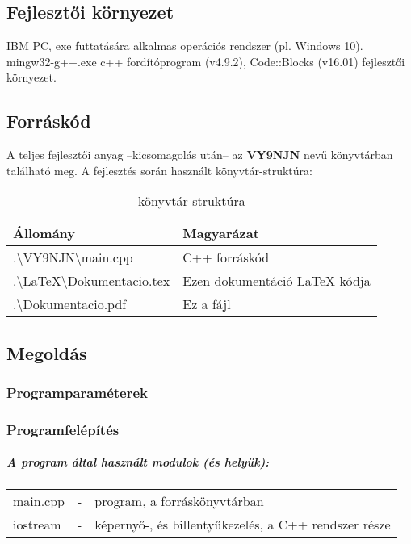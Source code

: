 \documentclass[a4paper]{article}
\begin{document}
    \subsection{Fejlesztői környezet}
    IBM PC, exe futtatására alkalmas operációs rendszer (pl. Windows 10). \\
    mingw32-g++.exe c++ fordítóprogram (v4.9.2), Code::Blocks (v16.01) fejlesztői környezet.
    \subsection{Forráskód}
    A teljes fejlesztői anyag –kicsomagolás után– az \textbf{VY9NJN} nevű könyvtárban található meg.
    A fejlesztés során használt könyvtár-struktúra:
    \begin{table}[H]
      \centering
      \caption{könyvtár-struktúra}
      \label{tab:table3}
      \begin{tabular}{ll}
        \toprule
        Állomány & Magyarázat \\
        \midrule
        .\textbackslash VY9NJN\textbackslash main.cpp & C++ forráskód \\
        .\textbackslash LaTeX\textbackslash Dokumentacio.tex & Ezen dokumentáció LaTeX kódja \\
        .\textbackslash Dokumentacio.pdf & Ez a fájl \\
        \bottomrule
      \end{tabular}
    \end{table}
    \subsection{Megoldás}
      \subsubsection{Programparaméterek}
      \subsubsection{Programfelépítés}
        \subparagraph{A program által használt modulok (és helyük):}
        \begin{center}
        \begin{tabular}{lcl}
          main.cpp & - & program, a forráskönyvtárban \\
          iostream & -& képernyő-, és billentyűkezelés, a C++ rendszer része \\
        \end{tabular}
      \end{center}
\end{document}
